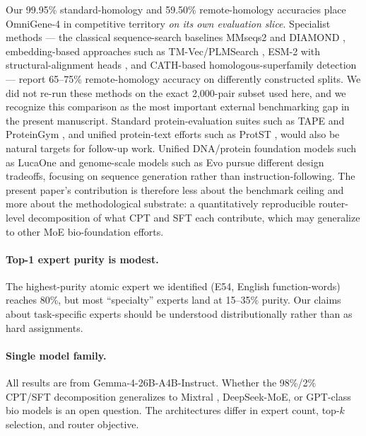 \documentclass[11pt]{article}
\begin{document}
Our 99.95\% standard-homology and 59.50\% remote-homology accuracies place OmniGene-4 in competitive territory \emph{on its own evaluation slice}. Specialist methods --- the classical sequence-search baselines MMseqs2 \citep{steinegger2017mmseqs2} and DIAMOND \citep{buchfink2021diamond}, embedding-based approaches such as TM-Vec/PLMSearch \citep{liu2024plmsearch}, ESM-2 with structural-alignment heads \citep{hamamsy2024protein}, and CATH-based homologous-superfamily detection \citep{nallapareddy2023cathe} --- report 65--75\% remote-homology accuracy on differently constructed splits. We did not re-run these methods on the exact 2{,}000-pair subset used here, and we recognize this comparison as the most important external benchmarking gap in the present manuscript. Standard protein-evaluation suites such as TAPE \citep{rao2019tape} and ProteinGym \citep{notin2023proteingym}, and unified protein-text efforts such as ProtST \citep{xu2023protst}, would also be natural targets for follow-up work. Unified DNA/protein foundation models such as LucaOne \citep{he2024lucaone} and genome-scale models such as Evo \citep{nguyen2024evo, brixi2026evo2} pursue different design tradeoffs, focusing on sequence generation rather than instruction-following. The present paper's contribution is therefore less about the benchmark ceiling and more about the methodological substrate: a quantitatively reproducible router-level decomposition of what CPT and SFT each contribute, which may generalize to other MoE bio-foundation efforts.

\label{sec:limitations}

\paragraph{Top-1 expert purity is modest.} The highest-purity atomic expert we identified (E54, English function-words) reaches 80\%, but most ``specialty'' experts land at 15--35\% purity. Our claims about task-specific experts should be understood distributionally rather than as hard assignments.

\paragraph{Single model family.} All results are from Gemma-4-26B-A4B-Instruct. Whether the 98\%/2\% CPT/SFT decomposition generalizes to Mixtral \citep{jiang2024mixtral}, DeepSeek-MoE, or GPT-class bio models is an open question. The architectures differ in expert count, top-$k$ selection, and router objective.
\end{document}
